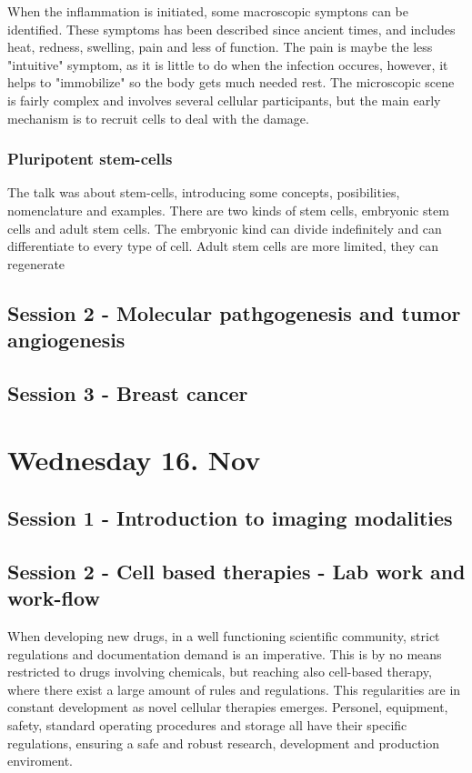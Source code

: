 \documentclass[12p]{article}
\begin{document}
When the inflammation is initiated, some macroscopic symptons can be identified.
These symptoms has been described since ancient times, and includes heat, redness, swelling, pain and less of function.
The pain is maybe the less "intuitive" symptom, as it is little to do when the infection occures, however, it helps to "immobilize" so the body gets much needed rest.
The microscopic scene is fairly complex and involves several cellular participants, but the main early mechanism is to recruit cells to deal with the damage. 

\subsubsection{Pluripotent stem-cells}

The talk was about stem-cells, introducing some concepts, posibilities, nomenclature and examples.
There are two kinds of stem cells, embryonic stem cells and adult stem cells.
The embryonic kind can divide indefinitely and can differentiate to every type of cell.
Adult stem cells are more limited, they can regenerate

\subsection*{Session 2 - Molecular pathgogenesis and tumor angiogenesis}

\subsection*{Session 3 - Breast cancer}

\section*{Wednesday 16. Nov}

\subsection*{Session 1 - Introduction to imaging modalities}

\subsection*{Session 2 - Cell based therapies - Lab work and work-flow}

When developing new drugs, in a well functioning scientific community, strict regulations and documentation demand is an imperative.
This is by no means restricted to drugs involving chemicals, but reaching also cell-based therapy, where there exist a large amount of rules and regulations.
This regularities are in constant development as novel cellular therapies emerges.
Personel, equipment, safety, standard operating procedures and storage all have their specific regulations, ensuring a safe and robust research, development and production enviroment.
\end{document}
